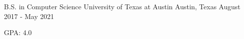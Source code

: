 

\begin{cventries}

  \cventry
    {B.S. in Computer Science} %
    {University of Texas at Austin} %
    {Austin, Texas} %
    {August 2017 - May 2021} %
    {
      \begin{cvitems} %
        \item {GPA: 4.0}
      \end{cvitems}
    }
\end{cventries}

